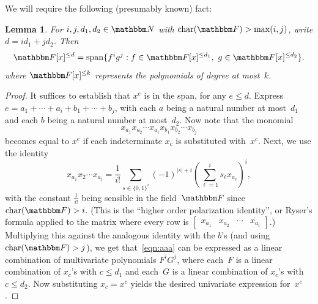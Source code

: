 \documentclass[10pt,a4paper]{article}
\newtheorem{lemma}[theorem]{Lemma}
\theoremstyle{definition}
\newcommand{\N}{\mathbbm N}
\newcommand{\F}{\mathbbm F}
\begin{document}
We will require the following (presumably known) fact:
\begin{lemma}\label{lem:powerspan}
    For $i,j,d_1,d_2 \in \N$ with $\mathrm{char}(\F) > \max(i,j)$, write $d = i d_1 + j d_2$. Then 
    \[
        \F[x]^{\leq d} = \mathrm{span}\{ f^i g^j : f \in \F[x]^{\leq d_1},\ g \in \F[x]^{\leq d_2}\}.
    \]
    where $\F[x]^{\leq k}$ represents the polynomials of degree at most~$k$.
\end{lemma}
\begin{proof}
It suffices to establish that $x^e$ is in the span, for any $e \leq d$.
Express $e = a_1 + \cdots + a_i + b_1 + \cdots + b_j$, with each $a$ being a natural number at most~$d_1$ and each $b$ being a natural number at most~$d_2$.
Now note that the monomial
\begin{equation} \label{eqn:aaa}
    x_{a_1} x_{a_2} \cdots x_{a_i} x_{b_1} x_{b_2} \cdots x_{b_j}
\end{equation}
becomes equal to $x^e$ if each indeterminate $x_c$ is substituted with~$x^c$.
Next, we use the identity
\[
    x_{a_1} x_2 \cdots x_{a_i} = \frac{1}{i!} \sum_{s \in \{0,1\}^i } (-1)^{|s|+i} \left (\sum_{\ell=1}^i s_\ell x_{a_\ell} \right)^i,
\]
with the constant $\frac{1}{i!}$ being sensible in the field~$\F$ since $\mathrm{char}(\F) > i$.
(This is the ``higher order polarization identity'', or Ryser's formula applied to the matrix where every row is $\begin{bmatrix} x_{a_1} & x_{a_2} & \cdots & x_{a_i} \end{bmatrix}$.)
Multiplying this against the analogous identity with the $b$'s (and using $\mathrm{char}(\F) > j$), we get that~\eqref{eqn:aaa} can be expressed as a linear combination of multivariate polynomials $F^i G^j$, where each~$F$ is a linear combination of $x_c$'s with $c \leq d_1$ and each~$G$ is a linear combination of $x_c$'s with $c \leq d_2$.
Now substituting $x_c = x^c$ yields the desired univariate expression for~$x^e$.
%
%
%
\end{proof}
\end{document}
